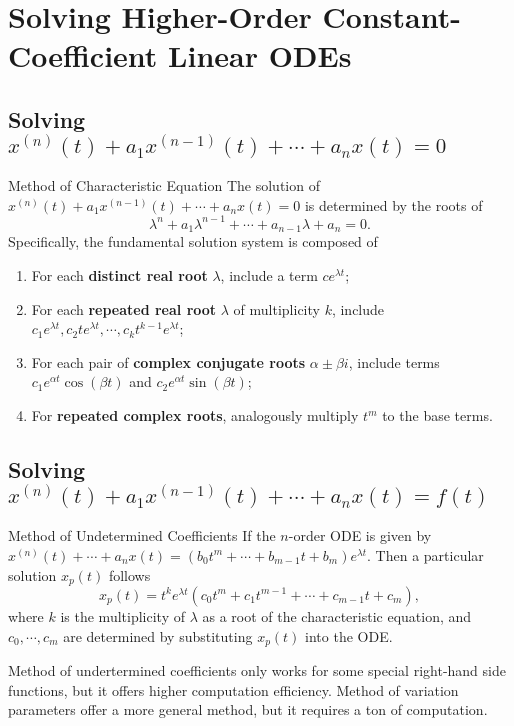 \section{Solving Higher-Order Constant-Coefficient Linear ODEs}

\subsection{Solving $x^{(n)}(t) + a_1x^{(n-1)}(t) + \cdots + a_nx(t) = 0$}

\begin{proposition}{Method of Characteristic Equation}{}
  The solution of $x^{(n)}(t) + a_1x^{(n-1)}(t) + \cdots + a_nx(t) = 0$ is determined by
  the roots of
  \begin{equation}
    \lambda^n + a_1 \lambda^{n-1} + \cdots + a_{n-1} \lambda + a_n = 0.
  \end{equation}
  Specifically, the fundamental solution system is composed of
  \begin{enumerate}
  \item For each \textbf{distinct real root} $\lambda$, include a term $c e^{\lambda t}$;
  \item For each \textbf{repeated real root} $\lambda$ of multiplicity $k$,
    include $c_1 e^{\lambda t}, c_2 t e^{\lambda t},\cdots, c_k t^{k-1} e^{\lambda t}$;
  \item For each pair of \textbf{complex conjugate roots} $\alpha \pm \beta i$,
    include terms $c_1 e^{\alpha t} \cos(\beta t)$ and $c_2 e^{\alpha t} \sin (\beta t)$;
  \item For \textbf{repeated complex roots}, analogously multiply $t^m$ to the base terms.
  \end{enumerate}
\end{proposition}

\subsection{Solving $x^{(n)}(t) + a_1x^{(n-1)}(t) + \cdots + a_nx(t) = f(t)$}

\begin{proposition}{Method of Undetermined Coefficients}{}
  If the $n$-order ODE is given by
  $x^{(n)}(t) + \cdots + a_nx(t) = (b_0t^m + \cdots + b_{m-1}t + b_m)e^{\lambda t}$.
  Then a particular solution $x_p(t)$ follows
  \begin{equation}
    x_p(t) = t^k e^{\lambda t} (c_0 t^m + c_1 t^{m-1} + \cdots + c_{m-1}t + c_m),
  \end{equation}
  where $k$ is the multiplicity of $\lambda$ as a root of the characteristic equation,
  and $c_0,\cdots,c_m$ are determined by substituting $x_p(t)$ into the ODE.
\end{proposition}

\begin{note}
  Method of undertermined coefficients only works for some special right-hand side functions,
  but it offers higher computation efficiency.
  Method of variation parameters offer a more general method, but it requires a ton of computation.
\end{note}





